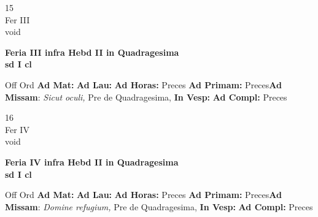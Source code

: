 \documentclass[10pt, openany]{book}
\begin{document}
    \begin{center}
        \begin{minipage}{3.5in}
            \vspace{2em}
            \begin{minipage}{0.5in}
                {\Huge 15} \\
                {\normalsize Fer III} \\
                {\normalsize void}
            \end{minipage}
            \begin{minipage}{3.0in}
                \textbf{ \large Feria III infra Hebd II in Quadragesima \\
                \textnormal{\normalsize sd I cl}} \\ 
            \end{minipage}
            \begin{justify}Off Ord
                \textbf{Ad Mat: }
                \textbf{Ad Lau: }
                \textbf{Ad Horas: }Preces
                \textbf{Ad Primam: }Preces\textbf{Ad Missam}: \textit{Sicut oculi,} Pre de Quadragesima,  
                \textbf{In Vesp: }
                \textbf{Ad Compl: }Preces
            \end{justify}
        \end{minipage}
    \end{center}

    \begin{center}
        \begin{minipage}{3.5in}
            \vspace{2em}
            \begin{minipage}{0.5in}
                {\Huge 16} \\
                {\normalsize Fer IV} \\
                {\normalsize void}
            \end{minipage}
            \begin{minipage}{3.0in}
                \textbf{ \large Feria IV infra Hebd II in Quadragesima \\
                \textnormal{\normalsize sd I cl}} \\ 
            \end{minipage}
            \begin{justify}Off Ord
                \textbf{Ad Mat: }
                \textbf{Ad Lau: }
                \textbf{Ad Horas: }Preces
                \textbf{Ad Primam: }Preces\textbf{Ad Missam}: \textit{Domine refugium,} Pre de Quadragesima,  
                \textbf{In Vesp: }
                \textbf{Ad Compl: }Preces
            \end{justify}
        \end{minipage}
    \end{center}
\end{document}
